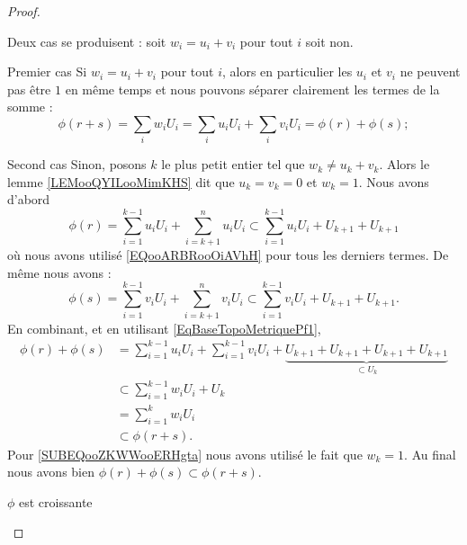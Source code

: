 \begin{proof}
\begin{subproof}
\begin{subproof}
        Deux cas se produisent : soit \( w_i=u_i+v_i\) pour tout \( i\) soit non.

        \begin{subproof}
        \item[Premier cas]
        Si \( w_i=u_i+v_i\) pour tout \( i\), alors en particulier les \( u_i\) et \( v_i\) ne peuvent pas être \( 1\) en même temps et nous pouvons séparer clairement les termes de la somme :
        \begin{equation}
            \phi(r+s) = \sum_i w_i U_i = \sum_i u_i U_i + \sum_i v_i U_i = \phi(r) + \phi(s);
        \end{equation}

        \item[Second cas]
            Sinon, posons \(k \) le plus petit entier tel que \( w_k \neq u_k + v_k\). Alors le lemme \ref{LEMooQYILooMimKHS} dit que \( u_k=v_k=0\) et \( w_k=1\). Nous avons d'abord
            \begin{equation}
        \phi(r) = \sum_{i=1}^{k-1} u_i U_i + \sum_{i=k+1}^n u_i U_i \subset \sum_{i=1}^{k-1} u_i U_i + U_{k+1}+ U_{k+1}
            \end{equation}
            où nous avons utilisé \eqref{EQooARBRooOiAVhH} pour tous les derniers termes. De même nous avons :
            \begin{equation}
        \phi(s) = \sum_{i=1}^{k-1} v_i U_i + \sum_{i=k+1}^n v_i U_i \subset \sum_{i=1}^{k-1} v_i U_i + U_{k+1}+ U_{k+1}.
            \end{equation}
            En combinant, et en utilisant \eqref{EqBaseTopoMetriquePf1},
            \begin{subequations}
                \begin{align}
                    \phi(r)+\phi(s) &= \sum_{i=1}^{k-1} u_i U_i + \sum_{i=1}^{k-1} v_i U_i +\underbrace{U_{k+1}+ U_{k+1} + U_{k+1}+ U_{k+1}}_{\subset U_k}\\
        &\subset \sum_{i=1}^{k-1} w_i U_i + U_k\\
        &= \sum_{i=1}^{k} w_i U_i       \label{SUBEQooZKWWooERHgta}\\
        &\subset \phi(r+s).
                \end{align}
            \end{subequations}
            Pour \eqref{SUBEQooZKWWooERHgta} nous avons utilisé le fait que \( w_k=1\). Au final nous avons bien \( \phi(r)+\phi(s)\subset\phi(r+s)\).
        \end{subproof}
    \item[\( \phi\) est croissante]

\end{subproof}
\end{subproof}
\end{proof}
